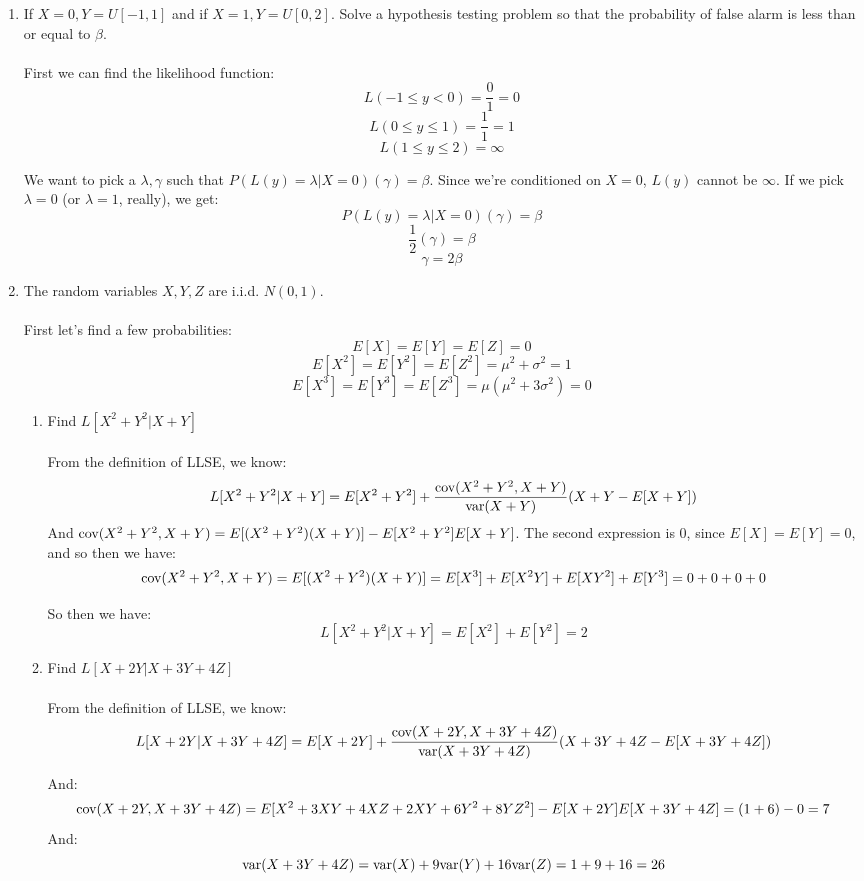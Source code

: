 \begin{enumerate}
  \item If $X = 0, Y = U[-1,1]$ and if $X=1, Y = U[0,2]$. Solve a hypothesis testing problem so that the probability of false alarm is less than or equal to $\beta$.\\\\

    First we can find the likelihood function:
    $$L(-1 \leq y < 0) = \frac{0}{1} = 0$$
    $$L(0 \leq y \leq 1) = \frac{1}{1} = 1$$
    $$L(1 \leq y \leq 2) = \infty$$
    
    We want to pick a $\lambda, \gamma$ such that $P(L(y) = \lambda | X = 0)(\gamma) = \beta$. Since we're conditioned on $X=0$, $L(y)$ cannot be $\infty$. If we pick $\lambda = 0$ (or $\lambda = 1$, really), we get:
    $$P(L(y) = \lambda | X=0)(\gamma) = \beta$$
    $$\frac{1}{2}(\gamma) = \beta$$
    $$\gamma = 2 \beta$$
  \item The random variables $X,Y,Z$ are i.i.d. $N(0,1)$.\\\\

    First let's find a few probabilities:
    $$E[X] = E[Y] = E[Z] = 0$$
    $$E[X^2] = E[Y^2] = E[Z^2] = \mu^2 + \sigma^2 = 1$$
    $$E[X^3] = E[Y^3] = E[Z^3] = \mu(\mu^2 + 3 \sigma^2) = 0$$
    \begin{enumerate}
      \item Find $L[X^2 + Y^2 | X + Y]$\\\\
        
        From the definition of LLSE, we know:
        $$L[X^2 + Y^2 | X + Y] = E[X^2 + Y^2] + \frac{\text{cov}(X^2+Y^2,X+Y)}{\text{var}(X+Y)}(X+Y - E[X+Y])$$
        And $\text{cov}(X^2+Y^2,X+Y) = E[(X^2+Y^2)(X+Y)] - E[X^2+Y^2]E[X+Y]$. The second expression is $0$, since $E[X]=E[Y]=0$, and so then we have:
        $$\text{cov}(X^2+Y^2,X+Y) = E[(X^2+Y^2)(X+Y)] = E[X^3] + E[X^2Y] + E[XY^2] + E[Y^3] = 0 + 0 + 0 + 0$$

        So then we have:
        $$L[X^2 + Y^2 | X + Y] = E[X^2] + E[Y^2] = 2$$

      \item Find $L[X + 2Y | X + 3Y + 4Z]$\\\\

        From the definition of LLSE, we know:
        $$L[X+2Y | X+3Y+4Z] = E[X+2Y] + \frac{\text{cov}(X+2Y,X+3Y+4Z)}{\text{var}(X+3Y+4Z)}(X+3Y+4Z - E[X+3Y+4Z])$$

        And: 
        $$\text{cov}(X+2Y,X+3Y+4Z) = E[X^2+3XY+4XZ+2XY+6Y^2+8YZ^2] - E[X+2Y]E[X+3Y+4Z] = (1+6) - 0 = 7$$
        And:
        $$\text{var}(X+3Y+4Z) = \text{var}(X) + 9\text{var}(Y) + 16\text{var}(Z) = 1+9+16 = 26$$


\end{enumerate}
\end{enumerate}
